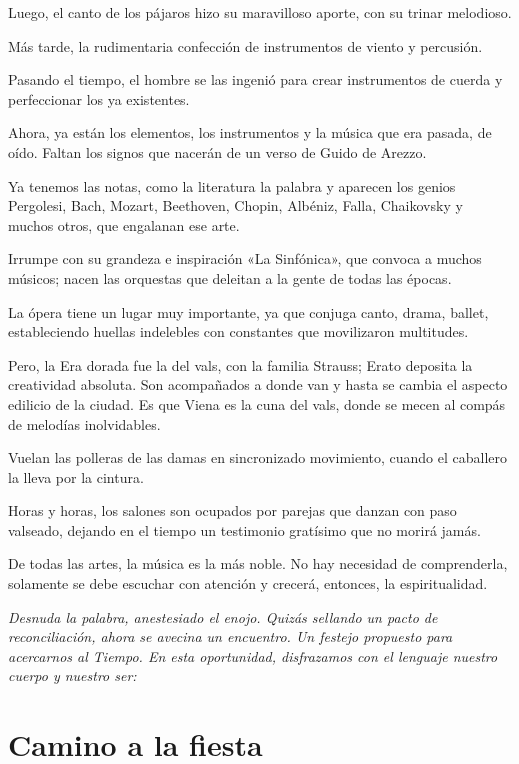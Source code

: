 \documentclass[11pt,twoside,openright,a5paper]{book}
\begin{document}
Luego, el canto de los pájaros hizo su maravilloso aporte, con su trinar melodioso.

Más tarde, la rudimentaria confección de instrumentos de viento y percusión.

Pasando el tiempo, el hombre se las ingenió para crear instrumentos de cuerda y perfeccionar los ya existentes.

Ahora, ya están los elementos, los instrumentos y la música que era pasada, de oído. Faltan los signos que nacerán de un verso de Guido de Arezzo.

Ya tenemos las notas, como la literatura la palabra y aparecen los genios Pergolesi, Bach, Mozart, Beethoven, Chopin, Albéniz, Falla, Chaikovsky y muchos otros, que engalanan ese arte.

Irrumpe con su grandeza e inspiración «La Sinfónica», que convoca a muchos músicos; nacen las orquestas que deleitan a la gente de todas las épocas.

La ópera tiene un lugar muy importante, ya que conjuga canto, drama, ballet, estableciendo huellas indelebles con constantes que movilizaron multitudes.

Pero, la Era dorada fue la del vals, con la familia Strauss; Erato deposita la creatividad absoluta. Son acompañados a donde van y hasta se cambia el aspecto edilicio de la ciudad. Es que Viena es la cuna del vals, donde se mecen al compás de melodías inolvidables.

Vuelan las polleras de las damas en sincronizado movimiento, cuando el caballero la lleva por la cintura.

Horas y horas, los salones son ocupados por parejas que danzan con paso valseado, dejando en el tiempo un testimonio gratísimo que no morirá jamás.

De todas las artes, la música es la más noble. No hay necesidad de comprenderla, solamente se debe escuchar con atención y crecerá, entonces, la espiritualidad.

\vspace{0.5cm}
\emph{Desnuda la palabra, anestesiado el enojo. Quizás sellando un pacto de reconciliación, ahora se avecina un encuentro. Un festejo propuesto para acercarnos al Tiempo. En esta oportunidad, disfrazamos con el lenguaje nuestro cuerpo y nuestro ser:}

\section*{Camino a la fiesta}
\end{document}
